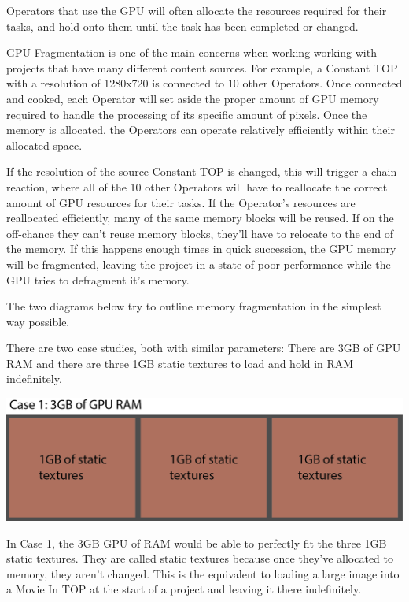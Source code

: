 \begin{fullwidth}

Operators that use the GPU will often allocate the resources required for their tasks, and hold onto them until the task has been completed or changed.

GPU Fragmentation is one of the main concerns when working working with projects that have many different content sources. For example, a Constant TOP with a resolution of 1280x720 is connected to 10 other Operators. Once connected and cooked, each Operator will set aside the proper amount of GPU memory required to handle the processing of its specific amount of pixels. Once the memory is allocated, the Operators can operate relatively efficiently within their allocated space.

If the resolution of the source Constant TOP is changed, this will trigger a chain reaction, where all of the 10 other Operators will have to reallocate the correct amount of GPU resources for their tasks. If the Operator's resources are reallocated efficiently, many of the same memory blocks will be reused. If on the off-chance they can't reuse memory blocks, they'll have to relocate to the end of the memory. If this happens enough times in quick succession, the GPU memory will be fragmented, leaving the project in a state of poor performance while the GPU tries to defragment it's memory.

The two diagrams below try to outline memory fragmentation in the simplest way possible.

There are two case studies, both with similar parameters: There are 3GB of GPU RAM and there are three 1GB static textures to load and hold in RAM indefinitely.

\begin{center}
\includegraphics{./img/11.6/memory-frag-1.png}
\end{center}

In Case 1, the 3GB GPU of RAM would be able to perfectly fit the three 1GB static textures. They are called static textures because once they've allocated to memory, they aren't changed. This is the equivalent to loading a large image into a Movie In TOP at the start of a project and leaving it there indefinitely.


\end{fullwidth}
